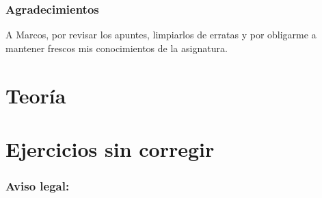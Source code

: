 \documentclass{report}
\begin{document}

\restorepagecolor

\pagestyle{fancy}
\fancyhead[R]{}

\section*{Agradecimientos}

A Marcos, por revisar los apuntes, limpiarlos de erratas y por obligarme a mantener frescos mis conocimientos de la  asignatura. 

\tableofcontents

\part{Teoría}











\clearpage


\part{Ejercicios sin corregir}

\section*{Aviso legal:}












\end{document}

